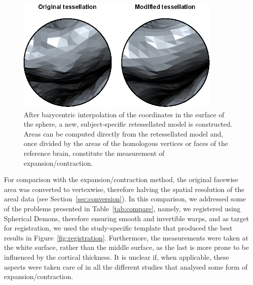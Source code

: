 \begin{figure}[!tbp]  %
\centering
\includegraphics[width=10cm]{images/retessellate.eps}
\caption[Example of a retessellated surface.]{After barycentric interpolation of the coordinates in the surface of the sphere, a new, subject-specific retessellated model is constructed. Areas can be computed directly from the retessellated model and, once divided by the areas of the homologous vertices or faces of the reference brain, constitute the measurement of expansion/contraction.}
\label{fig:retessellate}
\end{figure}

For comparison with the expansion/contraction method, the original facewise area was converted to vertexwise, therefore halving the spatial resolution of the areal data (see Section~\ref{sec:conversion}). In this comparison, we addressed some of the problems presented in Table~\ref{tab:compare}, namely, we registered using Spherical Demons, therefore ensuring smooth and invertible warps, and as target for registration, we used the study-specific template that produced the best results in Figure~\ref{fig:registration}. Furthermore, the measurements were taken at the white surface, rather than the middle surface, as the last is more prone to be influenced by the cortical thickness. It is unclear if, when applicable, these aspects were taken care of in all the different studies that analysed some form of expansion/contraction.

